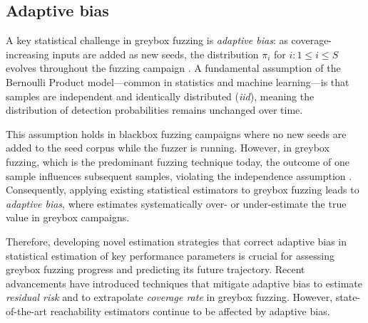 \documentclass[conference]{IEEEtran}
\begin{document}

\subsection{Adaptive bias}
A key statistical challenge in greybox fuzzing is \emph{adaptive bias}: as coverage-increasing inputs are added as new seeds, the distribution $\pi_i$ for $i: 1 \leq i \leq S$ evolves throughout the fuzzing campaign \cite{liyanage2021security}. A fundamental assumption of the Bernoulli Product model—common in statistics and machine learning—is that samples are independent and identically distributed (\emph{iid}), meaning the distribution of detection probabilities remains unchanged over time.  

This assumption holds in blackbox fuzzing campaigns where no new seeds are added to the seed corpus while the fuzzer is running. However, in greybox fuzzing, which is the predominant fuzzing technique today, the outcome of one sample influences subsequent samples, violating the independence assumption \cite{boehme2020boosting,boehme2018stads,liyanage2021security}. Consequently, applying existing statistical estimators to greybox fuzzing leads to \emph{adaptive bias}, where estimates systematically over- or under-estimate the true value in greybox campaigns.

Therefore, developing novel estimation strategies that correct adaptive bias in statistical estimation of key performance parameters is crucial for assessing greybox fuzzing progress and predicting its future trajectory. Recent advancements have introduced techniques that mitigate adaptive bias to estimate \emph{residual risk} \cite{boehme2021residual} and to extrapolate \emph{coverage rate} \cite{liyanage2024extrapolating} in greybox fuzzing. However, state-of-the-art reachability estimators continue to be affected by adaptive bias.
\end{document}
